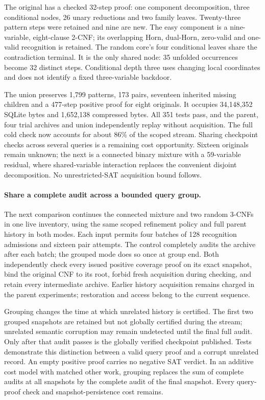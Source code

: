 \documentclass[11pt,a4paper]{article}
\numberwithin{equation}{section}
\theoremstyle{plain}
\theoremstyle{definition}
\theoremstyle{remark}
\begin{document}
The original has a checked 32-step proof: one component decomposition, three
conditional nodes, 26 unary reductions and two family leaves. Twenty-three
pattern steps were retained and nine are new. The easy component is a
nine-variable, eight-clause 2-CNF; its overlapping Horn, dual-Horn, zero-valid and
one-valid recognition is retained. The random core's four conditional leaves
share the contradiction terminal. It is the only shared node: 35 unfolded
occurrences become 32 distinct steps. Conditional depth three uses changing local
coordinates and does not identify a fixed three-variable backdoor.

The union preserves 1,799 patterns, 173 pairs, seventeen inherited missing
children and a 477-step positive proof for eight originals. It occupies
34,148,352 SQLite bytes and 1,652,138 compressed bytes. All 351 tests pass, and
the parent, four trial archives and union independently replay without acquisition.
The full cold check now accounts for about 86\% of the scoped stream. Sharing
checkpoint checks across several queries is a remaining cost opportunity.
Sixteen originals remain unknown; the next is a connected binary mixture with a
59-variable residual, where shared-variable interaction replaces the convenient
disjoint decomposition. No unrestricted-SAT acquisition bound follows.

\paragraph{Share a complete audit across a bounded query group.}
The next comparison continues the connected mixture and two random 3-CNFs in
one live inventory, using the same scoped refinement policy and full parent
history in both modes. Each input permits four batches of 128 recognition
admissions and sixteen pair attempts. The control completely audits the archive
after each batch; the grouped mode does so once at group end. Both independently
check every issued positive coverage proof on its exact snapshot, bind the original
CNF to its root, forbid fresh acquisition during checking, and retain every
intermediate archive. Earlier history acquisition remains charged in the parent
experiments; restoration and access belong to the current sequence.

Grouping changes the time at which unrelated history is certified. The first
two grouped snapshots are retained but not globally certified during the stream;
unrelated semantic corruption may remain undetected until the final full audit.
Only after that audit passes is the globally verified checkpoint published.
Tests demonstrate this distinction between a valid query proof and a corrupt
unrelated record. An empty positive proof carries no negative SAT verdict.
In an additive cost model with matched other work, grouping replaces the sum of
complete audits at all snapshots by the complete audit of the final snapshot.
Every query-proof check and snapshot-persistence cost remains.
\end{document}
